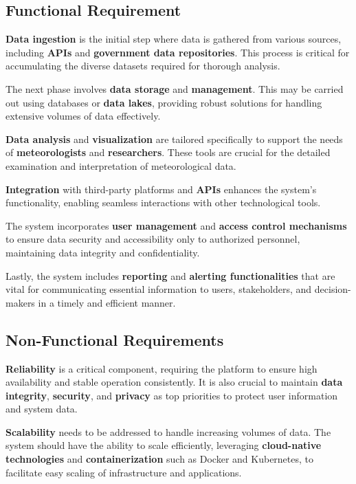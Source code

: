 \subsection{Functional Requirement}

\textbf{Data ingestion} is the initial step where data is gathered from various
sources, including \textbf{APIs} and \textbf{government data repositories}. This
process is critical for accumulating the diverse datasets required for thorough
analysis.

The next phase involves \textbf{data storage} and \textbf{management}. This may
be carried out using databases or \textbf{data lakes}, providing robust
solutions for handling extensive volumes of data effectively.

\textbf{Data analysis} and \textbf{visualization} are tailored specifically to
support the needs of \textbf{meteorologists} and \textbf{researchers}. These
tools are crucial for the detailed examination and interpretation of
meteorological data.

\textbf{Integration} with third-party platforms and \textbf{APIs} enhances the
system's functionality, enabling seamless interactions with other technological
tools.

The system incorporates \textbf{user management} and \textbf{access control
mechanisms} to ensure data security and accessibility only to authorized
personnel, maintaining data integrity and confidentiality.

Lastly, the system includes \textbf{reporting} and \textbf{alerting
functionalities} that are vital for communicating essential information to
users, stakeholders, and decision-makers in a timely and efficient manner.

\subsection{Non-Functional Requirements}

\textbf{Reliability} is a critical component, requiring the platform to ensure
high availability and stable operation consistently. It is also crucial to
maintain \textbf{data integrity}, \textbf{security}, and \textbf{privacy} as top
priorities to protect user information and system data.

\textbf{Scalability} needs to be addressed to handle increasing volumes of data.
The system should have the ability to scale efficiently, leveraging
\textbf{cloud-native technologies} and \textbf{containerization} such as Docker
and Kubernetes, to facilitate easy scaling of infrastructure and applications.

